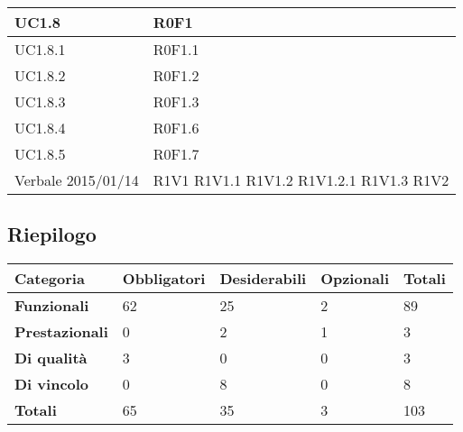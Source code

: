 \begin{center}
\begin{longtable}{| p{4cm} | p{4cm} |}
		\hline
		UC1.8  &  R0F1 \\
		\hline
		UC1.8.1  &  R0F1.1 \\
		\hline
		UC1.8.2  &  R0F1.2 \\
		\hline
		UC1.8.3  &  R0F1.3 \\
		\hline
		UC1.8.4  &  R0F1.6 \\
		\hline
		UC1.8.5  &  R0F1.7 \\
		\hline
		Verbale 2015/01/14  &  R1V1 \newline R1V1.1 \newline R1V1.2 \newline R1V1.2.1 \newline R1V1.3 \newline R1V2 \\
		\hline

	\end{longtable}
	\egroup
	\end{center}


\subsection{Riepilogo}

\begin{center}

	\def\arraystretch{1.5}
	\bgroup
	\begin{longtable}{| p{2.7cm} | p{2.4cm} | p{2.4cm} | p{2.4cm} | p{1.7cm} |}

		\hline
		\textbf{Categoria} & \textbf{Obbligatori} & \textbf{Desiderabili} & \textbf{Opzionali} & \textbf{Totali} \\
		\hline

		\textbf{Funzionali}  & 62 & 25 & 2 & 89\\
		\hline
		\textbf{Prestazionali} & 0 & 2 & 1 & 3\\
		\hline
		\textbf{Di qualità} & 3 & 0 & 0 & 3\\
		\hline
		\textbf{Di vincolo} & 0 & 8 & 0 & 8\\
		\hline
		\textbf{Totali}  & 65 & 35 & 3 & 103\\
		\hline
	\end{longtable}
	\egroup
\end{center}




